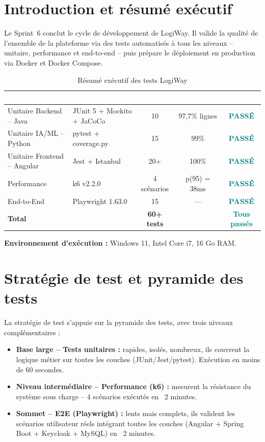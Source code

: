 \documentclass[12pt,a4paper]{report}
\newcommand{\thead}[1]{\cellcolor{tablehead}\textcolor{white}{\textbf{#1}}}
\begin{document}
\section{Introduction et résumé exécutif}
\label{sec:ch9-intro}

Le Sprint~6 conclut le cycle de développement de LogiWay. Il valide la
qualité de l'ensemble de la plateforme via des tests automatisés à tous
les niveaux -- unitaire, performance et end-to-end -- puis prépare le
déploiement en production via Docker et Docker Compose.

\begin{table}[H]
  \centering
  \caption{Résumé exécutif des tests LogiWay}
  \label{tab:tests_resume}
  \small
  \begin{tabularx}{\textwidth}{|X|X|c|c|c|}
    \hline
    \thead{Niveau} & \thead{Framework} & \thead{Nb} & \thead{Couverture} & \thead{Statut} \\
    \hline
    Unitaire Backend -- Java &
      JUnit 5 + Mockito + JaCoCo & 10 & 97,7\% lignes & \textcolor{teal}{\textbf{PASSÉ}} \\
    Unitaire IA/ML -- Python &
      pytest + coverage.py & 15 & 99\% & \textcolor{teal}{\textbf{PASSÉ}} \\
    Unitaire Frontend -- Angular &
      Jest + Istanbul & 20+ & 100\% & \textcolor{teal}{\textbf{PASSÉ}} \\
    Performance &
      k6 v2.2.0 & 4 scénarios & p(95) = 38ms & \textcolor{teal}{\textbf{PASSÉ}} \\
    End-to-End &
      Playwright 1.63.0 & 15 & --- & \textcolor{teal}{\textbf{PASSÉ}} \\
    \hline
    \textbf{Total} & & \textbf{60+ tests} & & \textcolor{teal}{\textbf{Tous passés}} \\
    \hline
  \end{tabularx}
\end{table}

\textbf{Environnement d'exécution :} Windows 11, Intel Core i7, 16 Go RAM.

\section{Stratégie de test et pyramide des tests}
\label{sec:ch9-pyramide}

La stratégie de test s'appuie sur la pyramide des tests, avec trois
niveaux complémentaires :

\begin{itemize}
  \item \textbf{Base large -- Tests unitaires :} rapides, isolés,
  nombreux, ils couvrent la logique métier sur toutes les couches
  (JUnit/Jest/pytest). Exécution en moins de 60 secondes.
  \item \textbf{Niveau intermédiaire -- Performance (k6) :} mesurent la
  résistance du système sous charge -- 4 scénarios exécutés en ~2 minutes.
  \item \textbf{Sommet -- E2E (Playwright) :} lents mais complets, ils
  valident les scénarios utilisateur réels intégrant toutes les couches
  (Angular + Spring Boot + Keycloak + MySQL) en ~2 minutes.
\end{itemize}
\end{document}
